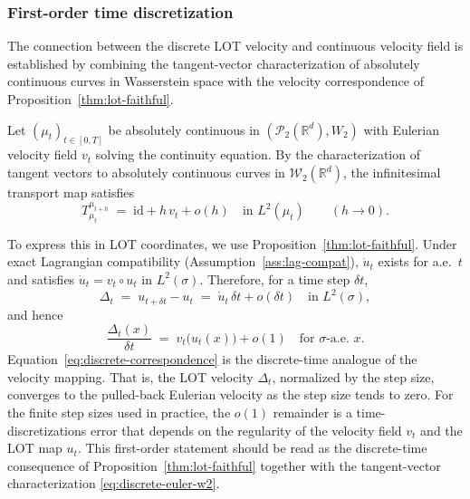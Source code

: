 \documentclass[11pt]{article}
\newcommand{\R}{\mathbb{R}}
\newcommand{\1}{\mathbf{1}}
\begin{document}
\subsubsection{First-order time discretization}

The connection between the discrete LOT velocity and continuous velocity field is established by combining the tangent-vector characterization of absolutely continuous curves in Wasserstein space with the velocity correspondence of Proposition~\ref{thm:lot-faithful}. 

Let $(\mu_t)_{t\in[0,T]}$ be absolutely continuous in $(\mathcal P_2(\R^d),W_2)$ with Eulerian velocity field $v_t$ solving the continuity equation. By the characterization of tangent vectors to absolutely continuous curves in
$\mathcal W_2(\R^d)$, the infinitesimal transport map satisfies
\cite[Theorem~8.3.1 and Proposition~8.4.6]{ambrosio2008gradient}
\begin{equation}\label{eq:discrete-euler-w2}
  T_{\mu_t}^{\mu_{t+h}}
  \;=\; \mathrm{id} + h\,v_t + o(h)
  \quad\text{in }L^2(\mu_t)\qquad(h\to 0).
\end{equation}

To express this in LOT coordinates, we use Proposition~\ref{thm:lot-faithful}. Under exact Lagrangian compatibility (Assumption~\ref{ass:lag-compat}), $\dot u_t$ exists for a.e.\ $t$ and satisfies $\dot u_t = v_t\circ u_t$ in $L^2(\sigma)$. Therefore, for a time step $\delta t$,
\begin{equation}\label{eq:discrete-euler-lot}
  \Delta_t
  \;=\; u_{t+\delta t}-u_t
  \;=\; \dot u_t\,\delta t + o(\delta t)
  \quad\text{in }L^2(\sigma),
\end{equation}
and hence
\begin{equation}\label{eq:discrete-correspondence}
  \frac{\Delta_t(x)}{\delta t}
  \;=\; v_t\bigl(u_t(x)\bigr) + o(1)
  \quad\text{for }\sigma\text{-a.e.\ }x.
\end{equation}
Equation~\eqref{eq:discrete-correspondence} is the discrete-time analogue of the velocity mapping. That is, the LOT velocity $\Delta_t$, normalized by the step size, converges to the pulled-back Eulerian velocity as the step size tends to zero.  For the finite step sizes used in practice, the $o(1)$ remainder is a time-discretizations error that depends on the regularity of the velocity field $v_t$ and the LOT map $u_t$. This first-order statement should be read as the discrete-time consequence of Proposition~\ref{thm:lot-faithful} together with the tangent-vector characterization \eqref{eq:discrete-euler-w2}.
\end{document}
